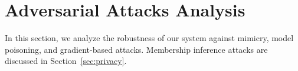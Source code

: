 


\section{Adversarial Attacks Analysis}
\label{sec:adversarial}

In this section, we analyze the robustness of our system against mimicry, model poisoning, and gradient-based attacks. Membership inference attacks are discussed in Section~\ref{sec:privacy}.

